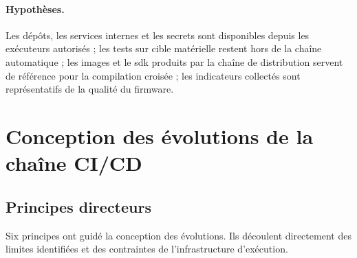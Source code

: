 \paragraph{Hypothèses.} Les dépôts, les services internes et les secrets sont
disponibles depuis les exécuteurs autorisés ; les tests sur cible matérielle
restent hors de la chaîne automatique ; les images et le \gls{sdk} produits par
la chaîne de distribution servent de référence pour la compilation croisée ;
les indicateurs collectés sont représentatifs de la qualité du firmware.

\section{Conception des évolutions de la chaîne CI/CD}
\label{sec:bes-conception}

\subsection{Principes directeurs}
\label{ssec:bes-principes}

Six principes ont guidé la conception des évolutions. Ils découlent directement
des limites identifiées et des contraintes de l'infrastructure d'exécution.

